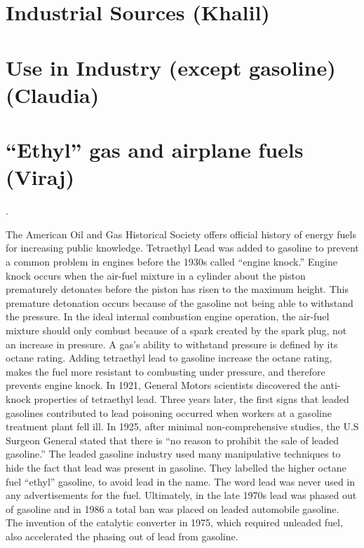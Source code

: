 \documentclass{article}\usepackage[]{graphicx}\usepackage[]{color}
\begin{document}
\section{Industrial Sources (Khalil)}


\section{Use in Industry (except gasoline) (Claudia)}

\section{``Ethyl'' gas and airplane fuels (Viraj)}

\bigskip

\noindent {} .

The American Oil and Gas Historical Society offers official history of energy fuels for increasing public knowledge. Tetraethyl Lead was added to gasoline to prevent a common problem in engines before the 1930s called “engine knock.” Engine knock occurs when the air-fuel mixture in a cylinder about the piston prematurely detonates before the piston has risen to the maximum height. This premature detonation occurs because of the gasoline not being able to withstand the pressure. In the ideal internal combustion engine operation, the air-fuel mixture should only combust because of a spark created by the spark plug, not an increase in pressure. A gas’s ability to withstand pressure is defined by its octane rating. Adding tetraethyl lead to gasoline increase the octane rating, makes the fuel more resistant to combusting under pressure, and therefore prevents engine knock. In 1921, General Motors scientists discovered the anti-knock properties of tetraethyl lead. Three years later, the first signs that leaded gasolines contributed to lead poisoning occurred when workers at a gasoline treatment plant fell ill. In 1925, after minimal non-comprehensive studies, the U.S Surgeon General stated that there is “no reason to prohibit the sale of leaded gasoline.” The leaded gasoline industry used many manipulative techniques to hide the fact that lead was present in gasoline. They labelled the higher octane fuel “ethyl” gasoline, to avoid lead in the name. The word lead was never used in any advertisements for the fuel. Ultimately, in the late 1970s lead was phased out of gasoline and in 1986 a total ban was placed on leaded automobile gasoline. The invention of the catalytic converter in 1975, which required unleaded fuel, also accelerated the phasing out of lead from gasoline. 
\end{document}
